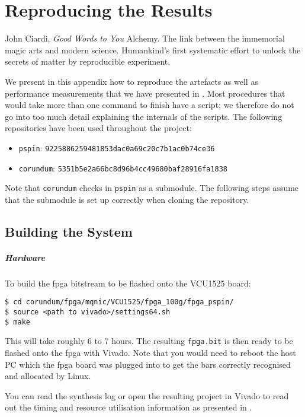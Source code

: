 \chapter{Reproducing the Results}
\begin{chapquote}{John Ciardi, \textit{Good Words to You}}
Alchemy. The link between the immemorial magic arts and modern science. Humankind’s first systematic effort to unlock the secrets of matter by reproducible experiment.
\end{chapquote}

We present in this appendix how to reproduce the artefacts as well as performance measurements that we have presented in .  Most procedures that would take more than one command to finish have a script; we therefore do not go into too much detail explaining the internals of the scripts.  The following repositories have been used throughout the project:
\begin{itemize}
    \item \texttt{pspin}: \texttt{9225886259481853dac0a69c20c7b1ac0b74ce36}
    \item \texttt{corundum}: \texttt{5351b5e2a66bc8d96b4cc49680baf28916fa1838}
\end{itemize}
Note that \texttt{corundum} checks in \texttt{pspin} as a submodule.  The following steps assume that the submodule is set up correctly when cloning the repository.

\section{Building the System}

\paragraph{Hardware} To build the \ac{fpga} bitstream to be flashed onto the VCU1525 board:

\begin{verbatim}
$ cd corundum/fpga/mqnic/VCU1525/fpga_100g/fpga_pspin/
$ source <path to vivado>/settings64.sh
$ make
\end{verbatim}
This will take roughly 6 to 7 hours.  The resulting \texttt{fpga.bit} is then ready to be flashed onto the \ac{fpga} with Vivado.  Note that you would need to reboot the host PC which the \ac{fpga} board was plugged into to get the \ac{bar}s correctly recognised and allocated by Linux.

You can read the synthesis log or open the resulting project in Vivado to read out the timing and resource utilisation information as presented in .

